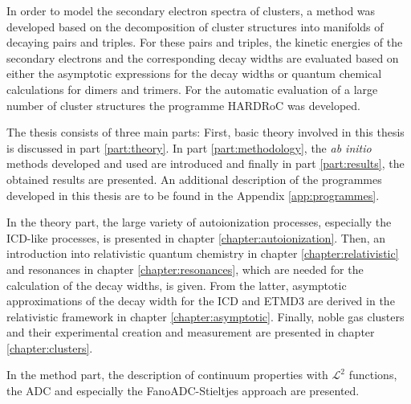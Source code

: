 In order to model the secondary electron spectra of clusters, a method
was developed based on the decomposition of cluster structures into manifolds
of decaying pairs and triples. For these pairs and triples, the kinetic energies
of the secondary electrons and the corresponding decay widths are evaluated based
on either the asymptotic expressions for the decay widths or quantum chemical
calculations for dimers and trimers. For the automatic evaluation of
a large number of cluster structures the programme
\ac{HARDRoC} \cite{HARDRoC} was developed.

The thesis consists of three main parts:
First, basic theory involved in this thesis is discussed in part
\ref{part:theory}. In part \ref{part:methodology}, the
\emph{ab initio} methods developed and used are introduced and
finally in part \ref{part:results}, the obtained results are presented.
An additional description of the programmes developed in this thesis are to
be found in the Appendix \ref{app:programmes}.

In the theory part, the large variety of autoionization processes,
especially the \ac{ICD}-like processes, is presented in chapter
\ref{chapter:autoionization}. Then, an introduction
into relativistic quantum chemistry in chapter \ref{chapter:relativistic}
and resonances in chapter \ref{chapter:resonances}, which are needed for
the calculation of the decay widths, is given. From the latter, asymptotic
approximations of the decay width for the \ac{ICD} and ETMD3 are derived
in the relativistic framework in chapter \ref{chapter:asymptotic}.
Finally, noble gas clusters and their experimental creation and measurement
are presented in chapter \ref{chapter:clusters}.

In the method part, the description of continuum properties with $\mathcal{L}^2$
functions, the \ac{ADC} and especially the FanoADC-Stieltjes approach are
presented.

